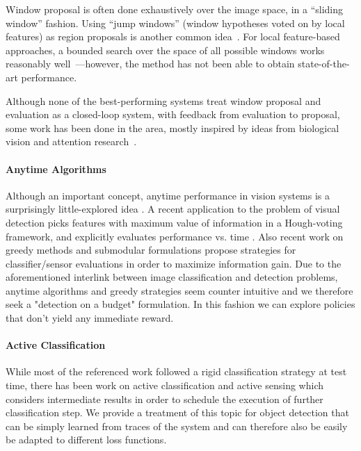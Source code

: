 Window proposal is often done exhaustively over the image space, in a ``sliding window'' fashion.
Using ``jump windows'' (window hypotheses voted on by local features) as region proposals is another common idea~\cite{Chum2007b,Vedaldi2009,Vijayanarasimhan2011}.
For local feature-based approaches, a bounded search over the space of all possible windows works reasonably well~\cite{Lampert2008b}---however, the method has not been able to obtain state-of-the-art performance.

Although none of the best-performing systems treat window proposal and evaluation as a closed-loop system, with feedback from evaluation to proposal, some work has been done in the area, mostly inspired by ideas from biological vision and attention research~\cite{Butko2009,Vogel2008,Paletta2005}.

\paragraph{Anytime Algorithms}
Although an important concept, anytime performance in vision systems is a surprisingly little-explored idea \cite{Shlomo Zilberstein}.
A recent application to the problem of visual detection picks features with maximum value of information in a Hough-voting framework, and explicitly evaluates performance vs. time \cite{Vijayanarasimhan2010}. 
Also recent work on greedy methods and submodular formulations propose strategies for classifier/sensor evaluations in order to maximize information gain. Due to the aforementioned interlink between image classification and detection problems, anytime algorithms and greedy strategies seem counter intuitive and we therefore seek a "detection on a budget" formulation. In this fashion we can explore policies that don't yield any immediate reward.

\paragraph{Active Classification}
While most of the referenced work followed a rigid classification strategy at test time, there has been work on active classification \cite{Active Classification based on Value of Classifier}
 and active sensing  \cite{active sensing} which considers intermediate results in order to schedule the execution of further classification step. We provide a treatment of this topic for object detection that can be simply learned from traces of the system and can therefore also be easily be adapted to different loss functions.


